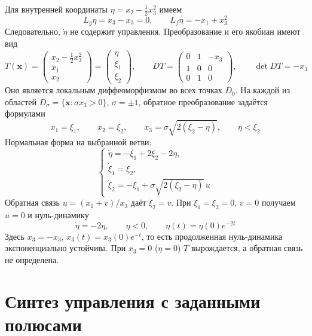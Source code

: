 Для внутренней координаты $\eta=x_2-\tfrac12x_3^2$ имеем
\begin{equation}
  L_g\eta=x_3-x_3=0,\qquad L_f\eta=-x_1+x_3^2
\end{equation}
Следовательно, $\dot\eta$ не содержит управления. Преобразование
и его якобиан имеют вид
\begin{equation}
  T(\bm x)=\begin{pmatrix}x_2-\tfrac12x_3^2\\x_1\\x_2\end{pmatrix}
  =\begin{pmatrix}\eta\\\xi_1\\\xi_2\end{pmatrix},\qquad
  DT=\begin{pmatrix}0&1&-x_3\\1&0&0\\0&1&0\end{pmatrix},\qquad
  \det DT=-x_3
\end{equation}
Оно является локальным диффеоморфизмом во всех точках $D_0$.
На каждой из областей $D_\sigma=\{\bm x:\sigma x_3>0\}$,
$\sigma=\pm1$, обратное преобразование задаётся формулами
\begin{equation}
  x_1=\xi_1,\qquad x_2=\xi_2,\qquad
  x_3=\sigma\sqrt{2(\xi_2-\eta)},\qquad \eta<\xi_2
\end{equation}
Нормальная форма на выбранной ветви:
\begin{equation}
  \begin{cases}
    \dot\eta=-\xi_1+2\xi_2-2\eta,\\
    \dot \xi_1=\xi_2,\\
    \dot \xi_2=-\xi_1+\sigma\sqrt{2(\xi_2-\eta)}\,u
  \end{cases}
\end{equation}
Обратная связь $u=(x_1+v)/x_3$ даёт $\dot \xi_2=v$.
При $\xi_1=\xi_2=0$, $v=0$ получаем $u=0$ и нуль-динамику
\begin{equation}
  \dot\eta=-2\eta,\qquad \eta<0,\qquad
  \eta(t)=\eta(0)e^{-2t}
\end{equation}
Здесь $\dot x_3=-x_3$, $x_3(t)=x_3(0)e^{-t}$, то есть
продолженная нуль-динамика экспоненциально устойчива.
При $x_3=0$ ($\eta=0$) $T$ вырождается,
а обратная связь не определена.

\section{Синтез управления с заданными полюсами}

